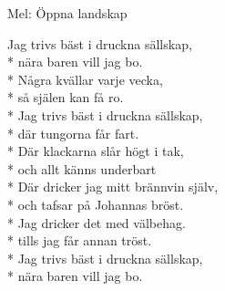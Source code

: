 \begin{SongText}
    \begin{SongInfo}
        Mel: Öppna landskap
    \end{SongInfo}
    \begin{SongVerse}
        Jag trivs bäst i druckna sällskap,\\*%
        nära baren vill jag bo.\\*%
        Några kvällar varje vecka,\\*%
        så själen kan få ro.\\*%
        Jag trivs bäst i druckna sällskap,\\*%
        där tungorna får fart.\\*%
        Där klackarna slår högt i tak,\\*%
        och allt känns underbart\\*%
        Där dricker jag mitt brännvin själv,\\*%
        och tafsar på Johannas bröst.\\*%
        Jag dricker det med välbehag.\\*%
        tills jag får annan tröst.\\*%
        Jag trivs bäst i druckna sällskap,\\*%
        nära baren vill jag bo. 
    \end{SongVerse}
\end{SongText}
